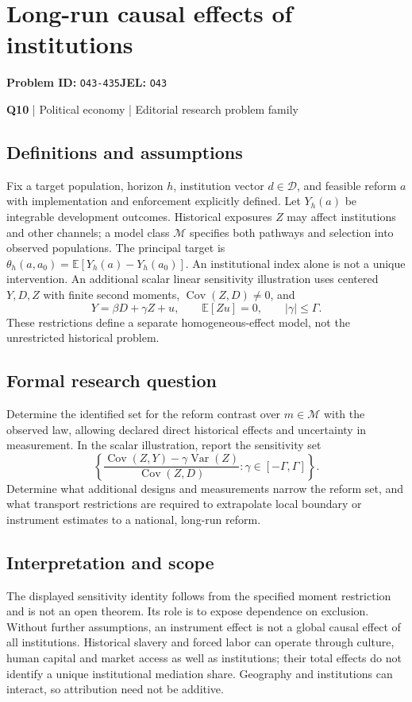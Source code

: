 \documentclass[11pt,a4paper]{article}
\begin{document}
\section*{Long-run causal effects of institutions}
\textbf{Problem ID:} \texttt{O43-435}\quad \textbf{JEL:} \texttt{O43}\par
\label{problem:OP-0130}
\label{atlas:prob:Q10}
{\sffamily\small\color{muted}\textbf{Q10} | Political economy | Editorial research problem family\par}
\subsection*{Definitions and assumptions}
Fix a target population, horizon $h$, institution vector $d\in\mathcal D$, and feasible reform $a$ with implementation and enforcement explicitly defined. Let $Y_h(a)$ be integrable development outcomes. Historical exposures $Z$ may affect institutions and other channels; a model class $\mathcal M$ specifies both pathways and selection into observed populations. The principal target is $\theta_h(a,a_0)=\mathbb E[Y_h(a)-Y_h(a_0)]$. An institutional index alone is not a unique intervention. An additional scalar linear sensitivity illustration uses centered $Y,D,Z$ with finite second moments, $\operatorname{Cov}(Z,D)\ne0$, and
\[
Y=\beta D+\gamma Z+u,\qquad \mathbb E[Zu]=0,\qquad |\gamma|\leq\Gamma.
\]
These restrictions define a separate homogeneous-effect model, not the unrestricted historical problem.
\subsection*{Formal research question}
Determine the identified set for the reform contrast over $m\in\mathcal M$ with the observed law, allowing declared direct historical effects and uncertainty in measurement. In the scalar illustration, report the sensitivity set
\[
\left\{\frac{\operatorname{Cov}(Z,Y)-\gamma\operatorname{Var}(Z)}{\operatorname{Cov}(Z,D)}:\gamma\in[-\Gamma,\Gamma]\right\}.
\]
Determine what additional designs and measurements narrow the reform set, and what transport restrictions are required to extrapolate local boundary or instrument estimates to a national, long-run reform.
\subsection*{Interpretation and scope}
The displayed sensitivity identity follows from the specified moment restriction and is not an open theorem. Its role is to expose dependence on exclusion. Without further assumptions, an instrument effect is not a global causal effect of all institutions. Historical slavery and forced labor can operate through culture, human capital and market access as well as institutions; their total effects do not identify a unique institutional mediation share. Geography and institutions can interact, so attribution need not be additive.
\end{document}
